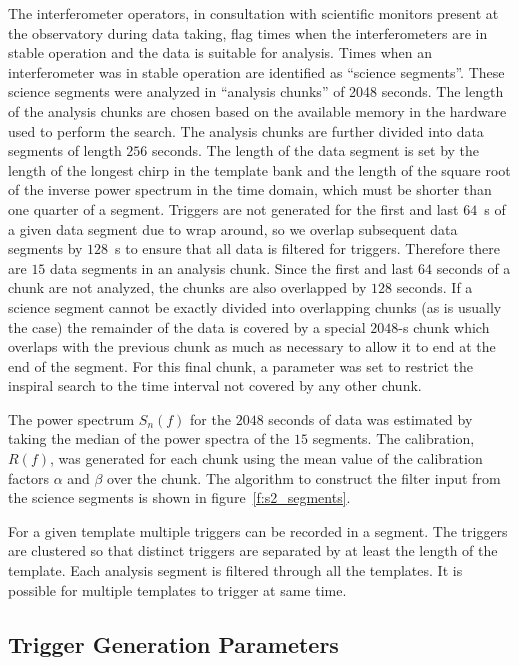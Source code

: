 The interferometer operators, in consultation with scientific monitors present
at the observatory during data taking, flag times when the interferometers are
in stable operation and the data is suitable for analysis.  Times when an
interferometer was in stable operation are identified as ``science segments''.
These science segments were analyzed in ``analysis chunks'' of 2048 seconds.
The length of the analysis chunks are chosen based on the available memory in
the hardware used to perform the search.  The analysis chunks are further
divided into data segments of length $256$ seconds. The length of the data
segment is set by the length of the longest chirp in the template bank and the
length of the square root of the inverse power spectrum in the time domain,
which must be shorter than one quarter of a segment.  Triggers are not
generated for the first and last $64$~s of a given data segment due to wrap
around, so we overlap subsequent data segments by $128$~s to ensure that all
data is filtered for triggers. Therefore there are $15$ data segments in an
analysis chunk. Since the first and last $64$ seconds of a chunk are not
analyzed, the chunks are also overlapped by $128$ seconds.  If a science
segment cannot be exactly divided into overlapping chunks (as is usually the
case) the remainder of the data is covered by a special $2048$-s chunk which
overlaps with the previous chunk as much as necessary to allow it to end at
the end of the segment.  For this final chunk, a parameter was set to restrict
the inspiral search to the time interval not covered by any other chunk. 

  The
power spectrum $S_n(f)$ for the $2048$ seconds of data was estimated by taking
the median of the power spectra of the $15$ segments.  The calibration,
$R(f)$, was generated for each chunk using the mean value of the calibration
factors $\alpha$ and $\beta$ over the chunk.  The algorithm to construct the
filter input from the science segments is shown in figure~\ref{f:s2_segments}.

For a given template multiple triggers can be recorded in a segment.  The
triggers are clustered so that distinct triggers are separated by at least the
length of the template.  Each analysis segment is filtered through all the
templates. It is possible for multiple templates to trigger at same time.

\subsection{Trigger Generation Parameters}
\label{ss:triggerparameters}

